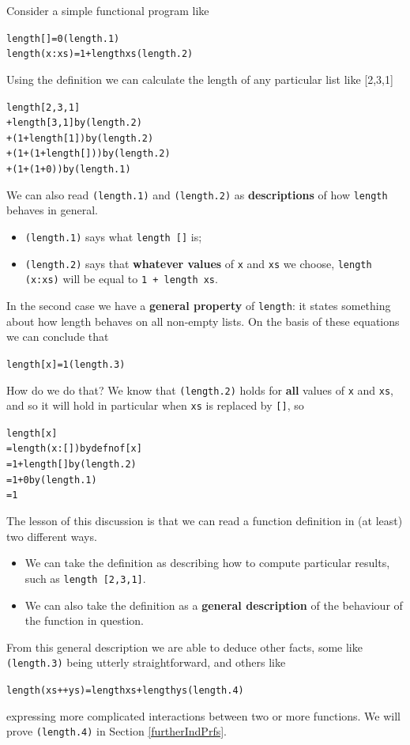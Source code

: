 Consider a simple functional program like
\begin{alltt}
length []     = 0\hfill(length.1)
length (x:xs) = 1 + length xs\hfill(length.2)
\end{alltt}
Using the definition we can calculate the length of any particular list
like [2,3,1]
\begin{alltt}
length [2,3,1]
 + length [3,1]\hfill\textrm{by }(length.2)
 + (1 + length [1])\hfill\textrm{by }(length.2)
 + (1 + (1 + length []))\hfill\textrm{by }(length.2)
 + (1 + (1 + 0))\hfill\textrm{by }(length.1)
\end{alltt}
We can also read \texttt{(length.1)} and \texttt{(length.2)} as
\textbf{descriptions} of how \texttt{length} behaves in general.
\begin{itemize}
\item \texttt{(length.1)} says what \texttt{length []} is;
\item \texttt{(length.2)} says that \textbf{whatever values} of
\texttt{x} and \texttt{xs} we choose, \texttt{length (x:xs)} will be
equal to \texttt{1 + length xs}.
\end{itemize}
In the second case we have a \textbf{general property} of
\texttt{length}: it states something about
how length behaves on all non-empty lists.
On the basis of these equations we can conclude that 
\begin{alltt}
length [x] = 1\hfill(length.3)
\end{alltt}
How do we do that? We know that \texttt{(length.2)} holds for \textbf{all} 
values of \texttt{x} and \texttt{xs}, and so it will hold in particular
when \texttt{xs} is replaced by \texttt{[]}, so
\begin{alltt}
length [x] 
  = length (x:[])\hfill\textrm{by defn of \texttt[x]}
  = 1 + length []\hfill\textrm{by }(length.2)
  = 1 + 0 \hfill\textrm{by }(length.1)
  = 1
\end{alltt}
The lesson of this discussion is that we can read a function definition in
(at least) two different ways.
\begin{itemize}
\item We can take the definition as describing how to compute particular
results, such as \texttt{length [2,3,1]}.
\item We can also take the definition as a \textbf{general description}
of the behaviour of the function in question.
\end{itemize}
From this general description we are able to deduce other facts, some
like
\texttt{(length.3)} being
utterly straightforward, and others like
\begin{alltt}
length (xs ++ ys) = length xs + length ys\hfill(length.4) 
\end{alltt}
expressing more complicated interactions between two or more
functions. We will prove \texttt{(length.4)} in Section \ref{furtherIndPrfs}.

